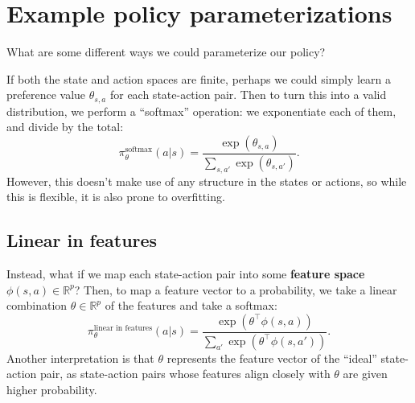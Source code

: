 \documentclass[\main/main]{subfiles}
\begin{document}
\section{Example policy parameterizations} \label{sec:parameterizations}

What are some different ways we could parameterize our policy?

If both the state and action spaces are finite, perhaps we could simply learn a preference value $\theta_{s,a}$ for each state-action pair. Then to turn this into a valid distribution, we perform a ``softmax'' operation: we exponentiate each of them, and divide by the total: \[
    \pi^\text{softmax}_\theta(a | s) = \frac{\exp(\theta_{s,a})}{\sum_{s,a'} \exp (\theta_{s,a'})}.
\]
However, this doesn't make use of any structure in the states or actions, so while this is flexible, it is also prone to overfitting.

\subsection{Linear in features}

Instead, what if we map each state-action pair into some \textbf{feature space} $\phi(s, a) \in \mathbb{R}^p$? Then, to map a feature vector to a probability,
we take a linear combination $\theta \in \mathbb{R}^p$ of the features and take a softmax: \[
    \pi^\text{linear in features}_{\theta}(a|s) = \frac{\exp(\theta^\top \phi(s, a))}{\sum_{a'} \exp(\theta^\top \phi(s, a'))}.
\]
Another interpretation is that $\theta$ represents the feature vector of the ``ideal'' state-action pair, as state-action pairs whose features align closely with $\theta$ are given higher probability.
\end{document}

